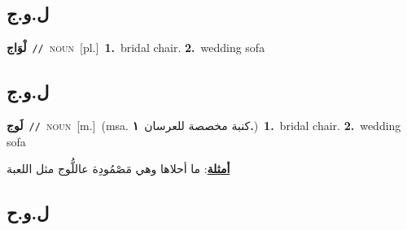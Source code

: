 \documentclass[10pt,a4paper,twoside]{article} %
\begin{document}
\begin{multicols}{2}
\vspace{-3mm}
\subsection*{\color{blue}\foreignlanguage{arabic}{ل.و.ج}\color{blue}{}} 

{\setlength\topsep{0pt}\textbf{\foreignlanguage{arabic}{لْوَاج}}\ {\color{gray}\texttt{//}\color{black}}\ \textsc{noun}\ [pl.]\ \textbf{1.}~bridal chair.  \textbf{2.}~wedding sofa\ } \vspace{2mm}

\vspace{-3mm}
\subsection*{\color{blue}\foreignlanguage{arabic}{ل.و.ج}\color{blue}{ (ntws)}} 

{\setlength\topsep{0pt}\textbf{\foreignlanguage{arabic}{لَوج}}\ {\color{gray}\texttt{//}\color{black}}\ \textsc{noun}\ [m.]\ \color{gray}(msa. \foreignlanguage{arabic}{كنبة مخصصة للعرسان}~\foreignlanguage{arabic}{\textbf{١.}})\color{black}\ \textbf{1.}~bridal chair.  \textbf{2.}~wedding sofa\  \begin{flushright}\color{gray}\foreignlanguage{arabic}{\textbf{\underline{\foreignlanguage{arabic}{أمثلة}}}: ما أحلاها وهي مَصْمُودِة عاللُّوج مثل اللعبة}\end{flushright}\color{black}} \vspace{2mm}

\vspace{-3mm}
\subsection*{\color{blue}\foreignlanguage{arabic}{ل.و.ح}\color{blue}{}} 


\end{multicols}
\end{document}
